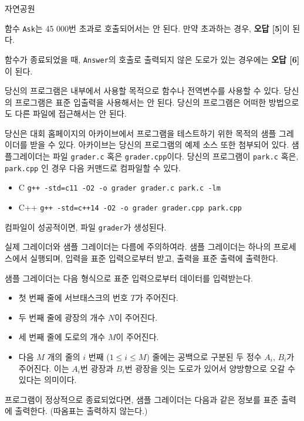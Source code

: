 \begin{problem}{자연공원}
\begin{itemize}
		함수 \texttt{Ask}는 45 000번 초과로 호출되어서는 안 된다. 만약 초과하는 경우, \textbf{오답 [5]}이 된다.
		
	\end{itemize}

	함수가 종료되었을 때, \texttt{Answer}의 호출로 출력되지 않은 도로가 있는 경우에는 \textbf{오답 [6]}이 된다.
	
	당신의 프로그램은 내부에서 사용할 목적으로 함수나 전역변수를 사용할 수 있다. 당신의 프로그램은 표준 입출력을 사용해서는 안 된다. 당신의 프로그램은 어떠한 방법으로도 다른 파일에 접근해서는 안 된다. 
	
	당신은 대회 홈페이지의 아카이브에서 프로그램을 테스트하기 위한 목적의 샘플 그레이더를 받을 수 있다. 아카이브는 당신의 프로그램의 예제 소스 또한 첨부되어 있다.
	샘플그레이더는 파일 \texttt{grader.c} 혹은 \texttt{grader.cpp}이다. 당신의 프로그램이 \texttt{park.c} 혹은, \texttt{park.cpp} 인 경우 다음 커맨드로 컴파일할 수 있다.
	
	\begin{itemize}
		\item C
		\texttt{g++ -std=c11 -O2 -o grader grader.c park.c -lm}
		\item C++
		\texttt{g++ -std=c++14 -O2 -o grader grader.cpp park.cpp}
	\end{itemize}
	
	컴파일이 성공적이면, 파일 \texttt{grader}가 생성된다.
	
	실제 그레이더와 샘플 그레이더는 다름에 주의하여라. 샘플 그레이더는 하나의 프로세스에서 실행되며, 입력을 표준 입력으로부터 받고, 출력을 표준 출력에 출력한다.
	
	\InputFile
	
	샘플 그레이더는 다음 형식으로 표준 입력으로부터 데이터를 입력받는다.
	
	\begin{itemize}
		\item 첫 번째 줄에 서브태스크의 번호 $T$가 주어진다.
		\item 두 번째 줄에 광장의 개수 $N$이 주어진다.
		\item 세 번째 줄에 도로의 개수 $M$이 주어진다.
		\item 다음 $M$ 개의 줄의 $i$ 번째 ($1 \le i \le M$) 줄에는 공백으로 구분된 두 정수 $A_i$, $B_i$가 주어진다. 이는 $A_i$번 광장과 $B_i$번 광장을 잇는 도로가 있어서 양방향으로 오갈 수 있다는 의미이다.
	\end{itemize}
	
	
	\OutputFile
	
	프로그램이 정상적으로 종료되었다면, 샘플 그레이더는 다음과 같은 정보를 표준 출력에 출력한다. (따옴표는 출력하지 않는다.)
	

\end{problem}
